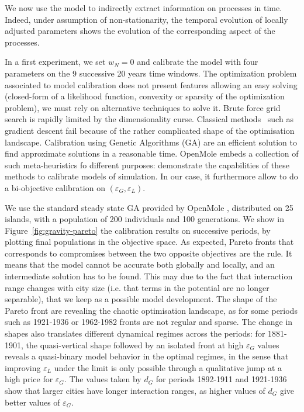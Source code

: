 \documentclass[Royal,sageh,times]{sagej}
\begin{document}
We now use the model to indirectly extract information on processes in time. Indeed, under assumption of non-stationarity, the temporal evolution of locally adjusted parameters shows the evolution of the corresponding aspect of the processes.

In a first experiment, we set $w_N=0$ and calibrate the model with four parameters on the 9 successive 20 years time windows. The optimization problem associated to model calibration does not present features allowing an easy solving (closed-form of a likelihood function, convexity or sparsity of the optimization problem), we must rely on alternative techniques to solve it. Brute force grid search is rapidly limited by the dimensionality curse. Classical methods~\citep{batty1972calibration} such as gradient descent fail because of the rather complicated shape of the optimisation landscape. Calibration using Genetic Algorithms (GA) are an efficient solution to find approximate solutions in a reasonable time. OpenMole embeds a collection of such meta-heuristics fo different purposes: \cite{schmitt2014half} demonstrate the capabilities of these methods to calibrate models of simulation. In our case, it furthermore allow to do a bi-objective calibration on $(\varepsilon_G,\varepsilon_L)$.

We use the standard steady state GA provided by OpenMole \citep{pumain2017urban}, distributed on 25 islands, with a population of 200 individuals and 100 generations. We show in Figure~\ref{fig:gravity-pareto} the calibration results on successive periods, by plotting final populations in the objective space. As expected, Pareto fronts that corresponds to compromises between the two opposite objectives are the rule. It means that the model cannot be accurate both globally and locally, and an intermediate solution has to be found. This may due to the fact that interaction range changes with city size (i.e. that terms in the potential are no longer separable), that we keep as a possible model development. The shape of the Pareto front are revealing the chaotic optimisation landscape, as for some periods such as 1921-1936 or 1962-1982 fronts are not regular and sparse. The change in shapes also translates different dynamical regimes across the periods: for 1881-1901, the quasi-vertical shape followed by an isolated front at high $\varepsilon_G$ values reveals a quasi-binary model behavior in the optimal regimes, in the sense that improving $\varepsilon_L$ under the limit is only possible through a qualitative jump at a high price for $\varepsilon_G$. The values taken by $d_G$ for periods 1892-1911 and 1921-1936 show that larger cities have longer interaction ranges, as higher values of $d_G$ give better values of $\varepsilon_G$.
\end{document}
